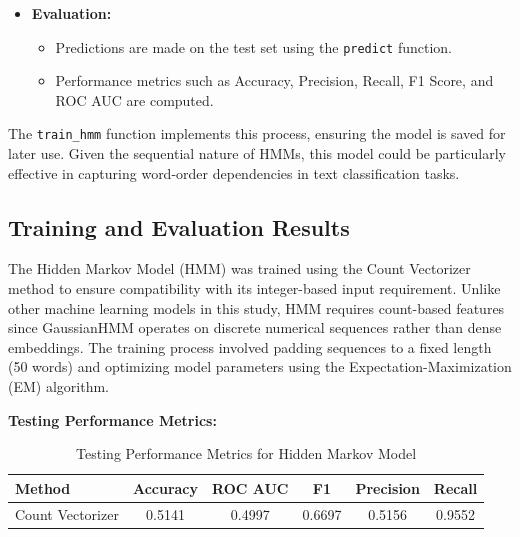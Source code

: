 \begin{itemize}
\begin{itemize}
\begin{itemize}
                    \item "cs" - Initializes both means and covariances.
                \end{itemize}
            \item \texttt{params}: Specifies which parameters should be updated during training, with tested values:
                \begin{itemize}
                    \item "c" - Updates only the means.
                    \item "t" - Updates only the transition matrix.
                    \item "ct" - Updates both means and transition matrix.
                \end{itemize}
        \end{itemize}
    \item \textbf{Evaluation:}
        \begin{itemize}
            \item Predictions are made on the test set using the \texttt{predict} function.
            \item Performance metrics such as Accuracy, Precision, Recall, F1 Score, and ROC AUC are computed.
        \end{itemize}
\end{itemize}

The \texttt{train\_hmm} function implements this process, ensuring the model is saved for later use. Given the sequential nature of HMMs, this model could be particularly effective in capturing word-order dependencies in text classification tasks.

\subsection{Training and Evaluation Results}

The Hidden Markov Model (HMM) was trained using the Count Vectorizer method to ensure compatibility with its integer-based input requirement. Unlike other machine learning models in this study, HMM requires count-based features since GaussianHMM operates on discrete numerical sequences rather than dense embeddings. The training process involved padding sequences to a fixed length (50 words) and optimizing model parameters using the Expectation-Maximization (EM) algorithm.

\textbf{Testing Performance Metrics:}

\begin{table}[H]
    \centering
    \caption{Testing Performance Metrics for Hidden Markov Model}
    \label{tab:hmm-testing-metrics}
    \begin{tabular}{|l|c|c|c|c|c|}
        \hline
        \textbf{Method} & \textbf{Accuracy} & \textbf{ROC AUC} & \textbf{F1} & \textbf{Precision} & \textbf{Recall} \\ 
        \hline
        Count Vectorizer & 0.5141 & 0.4997 & 0.6697 & 0.5156 & 0.9552 \\ 
        \hline
    \end{tabular}
\end{table}


